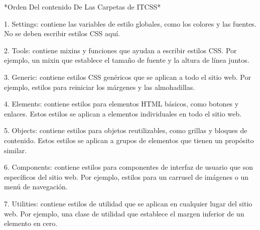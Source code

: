                 *Orden Del contenido De Las Carpetas de ITCSS*

1. Settings: contiene las variables de estilo globales, como los colores y las fuentes. 
No se deben escribir estilos CSS aquí.

2. Tools: contiene mixins y funciones que ayudan a escribir estilos CSS.
          Por ejemplo, un mixin que establece el tamaño de fuente y la altura de línea juntos.

3. Generic: contiene estilos CSS genéricos que se aplican a todo el sitio web.
         Por ejemplo, estilos para reiniciar los márgenes y las almohadillas.

4. Elements: contiene estilos para elementos HTML básicos, como botones y enlaces.
             Estos estilos se aplican a elementos individuales en todo el sitio web.

5. Objects: contiene estilos para objetos reutilizables, como grillas y bloques de contenido.
            Estos estilos se aplican a grupos de elementos que tienen un propósito similar.

6. Components: contiene estilos para componentes de interfaz de usuario que son específicos del sitio web. 
               Por ejemplo, estilos para un carrusel de imágenes o un menú de navegación.

7. Utilities: contiene estilos de utilidad que se aplican en cualquier lugar del sitio web. 
              Por ejemplo, una clase de utilidad que establece el margen inferior de un elemento en cero.